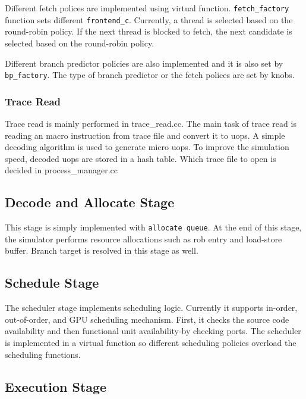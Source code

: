 Different fetch polices are implemented using virtual function. {\tt fetch\_factory} function sets 
different {\tt frontend\_c}. Currently, a thread is selected based on the round-robin policy. If the next thread is blocked to fetch, the next candidate is selected based on the round-robin policy. 

 Different branch predictor policies are also implemented and it is also set by {\tt bp\_factory}. The type of branch predictor or the fetch polices are set by knobs. 



\subsubsection{Trace Read} 
Trace read is mainly performed in trace\_read.cc. 
The main task of trace read is reading an macro instruction from trace file and convert it to uops. 
A simple decoding algorithm is used to generate micro uops. 
To improve the simulation speed, decoded uops are stored in a hash table. 
Which trace file to open is decided in process\_manager.cc 



\subsection{Decode and  Allocate Stage }
This stage is simply implemented with {\tt  allocate queue}.
At the end of this stage,  the simulator performs resource allocations such as rob entry and load-store buffer. 
Branch target is resolved in this stage as well. 

\subsection{Schedule Stage}
The scheduler stage implements scheduling logic. Currently it supports in-order, out-of-order, and GPU scheduling mechanism. 
First, it checks the source code availability and then functional unit availability-by checking ports. 
 The scheduler is implemented in a virtual function so different scheduling policies overload the scheduling functions. 

\subsection{Execution Stage}

